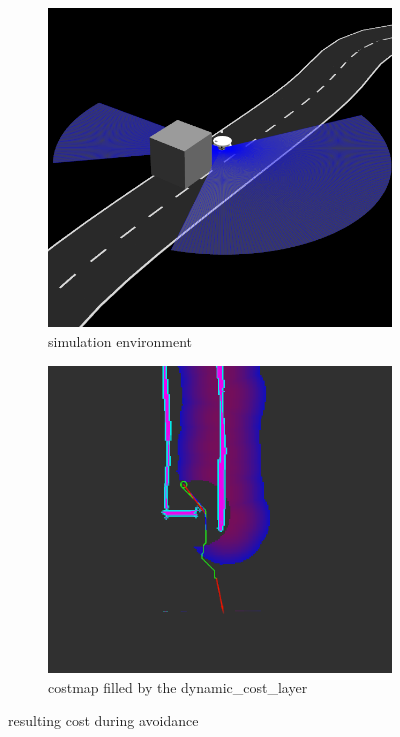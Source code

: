 \begin{figure}[H]
	\centering
	\begin{subfigure}{.45\linewidth}
		\includegraphics[width=\textwidth]{Pictures/avoidance}
		\caption{simulation environment}
		\end{subfigure}	
	\begin{subfigure}{.45\linewidth}
		\includegraphics[width=\textwidth]{Pictures/avoid cost}
		\caption{costmap filled by the dynamic\_cost\_layer}
	\end{subfigure}
	\caption{resulting cost during avoidance}
	\label{dyncost}
\end{figure}


